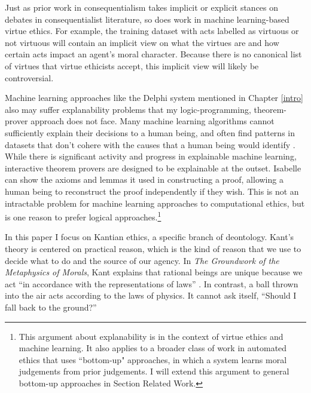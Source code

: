\begin{isabellebody}
\begin{isamarkuptext}
Just as prior work in consequentialism takes implicit or explicit stances on debates in consequentialist
literature, so does work in machine learning-based virtue ethics. For example, the training 
dataset with acts labelled as virtuous or not virtuous will contain an implicit view on what the virtues
are and how certain acts impact an agent's moral character. Because there is no canonical list of virtues
that virtue ethicists accept, this implicit view will likely be controversial.

Machine learning approaches like the Delphi system \citep{delphi} mentioned in Chapter \ref{intro} also may suffer explanability 
problems that my logic-programming, theorem-prover
approach does not face. Many machine learning algorithms cannot sufficiently explain their 
decisions to a human being, and often find patterns in datasets that don't 
cohere with the causes that a human being would identify \citep{puiutta}. While there is significant activity 
and progress in explainable machine learning, interactive theorem provers are designed to be explainable 
at the outset. Isabelle can show the axioms and lemmas it used in constructing a proof, 
allowing a human being to reconstruct the proof independently if they wish. This is not an 
intractable problem for machine learning approaches to computational ethics, but is one reason to 
prefer logical approaches.\footnote{This argument about explanability is in the context of virtue ethics and 
machine learning. It also applies to a broader class of work in automated ethics 
that uses ``bottom-up" approaches, in which a system learns moral judgements from prior judgements. 
I will extend this argument to general bottom-up approaches in Section Related Work.}%
\end{isamarkuptext}\isamarkuptrue%
%
\isadelimdocument
%
\endisadelimdocument
%
\isatagdocument
%
\isamarkuptrue%
%
\endisatagdocument
{\isafolddocument}%
%
\isadelimdocument
%
\endisadelimdocument
%
\begin{isamarkuptext}%
In this paper I focus on Kantian ethics, a specific branch of deontology. Kant's theory is centered 
on practical reason, which is the kind of reason that we 
use to decide what to do and the source of our agency. In \emph{The Groundwork of the Metaphysics of Morals}, Kant explains that 
rational beings are unique because we act ``in accordance with 
the representations of laws'' \citep[4:412]{groundwork}. In contrast, a ball thrown into the air acts 
according to the laws of physics. It cannot ask itself, ``Should I fall back to the ground?'' 

\end{isamarkuptext}
\end{isabellebody}
